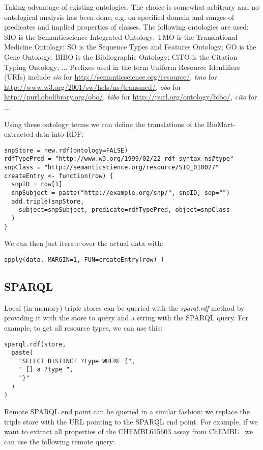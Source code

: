 \documentclass[12pt]{article}
\begin{document}
Taking advantage of existing ontologies. The choice is somewhat arbitrary and no ontological
analysis has been done, e.g. on specified domain and ranges of predicates and implied
properties of classes. The following ontologies are used:
SIO is the Semanticscience Integrated Ontology; TMO is the Translational Medicine Ontology;
SO is the Sequence Types and Features Ontology; GO is the Gene Ontology;
BIBO is the Bibliographic Ontology; CiTO is the Citation Typing Ontology;
... Prefixes used in the term Uniform Resource Identifiers (URIs) include
\textit{sio} for \url{http://semanticscience.org/resource/},
\textit{tmo} for \url{http://www.w3.org/2001/sw/hcls/ns/transmed/},
\textit{obo} for \url{http://purl.obolibrary.org/obo/},
\textit{bibo} for \url{http://purl.org/ontology/bibo/},
\textit{cito} for \url{} ...

Using these ontology terms we can define the translations of the BioMart-extracted
data into RDF:

\begin{verbatim}
snpStore = new.rdf(ontology=FALSE)
rdfTypePred = "http://www.w3.org/1999/02/22-rdf-syntax-ns#type"
snpClass = "http://semanticscience.org/resource/SIO_010027"
createEntry <- function(row) {
  snpID = row[1]
  snpSubject = paste("http://example.org/snp/", snpID, sep="")
  add.triple(snpStore,
    subject=snpSubject, predicate=rdfTypePred, object=snpClass
  )
}
\end{verbatim}

We can then just iterate over the actual data with:

\begin{verbatim}
apply(data, MARGIN=1, FUN=createEntry(row) )
\end{verbatim}

\subsection{SPARQL}

Local (in-memory) triple stores can be queried with the \emph{sparql.rdf} method by providing
it with the store to query and a string with the SPARQL query. For example, to get all resource
types, we can use this:

\begin{verbatim}
sparql.rdf(store,
  paste(
    "SELECT DISTINCT ?type WHERE {",
    " [] a ?type ",
    "}"
  )
) 
\end{verbatim}

Remote SPARQL end point can be queried in a similar fashion: we replace the triple store with the
URL pointing to the SPARQL end point. For example, if we want to
extract all properties of the CHEMBL615603 assay from ChEMBL~\cite{Gaulton2012,Willighagen2013}
we can use the following remote query:
\end{document}
